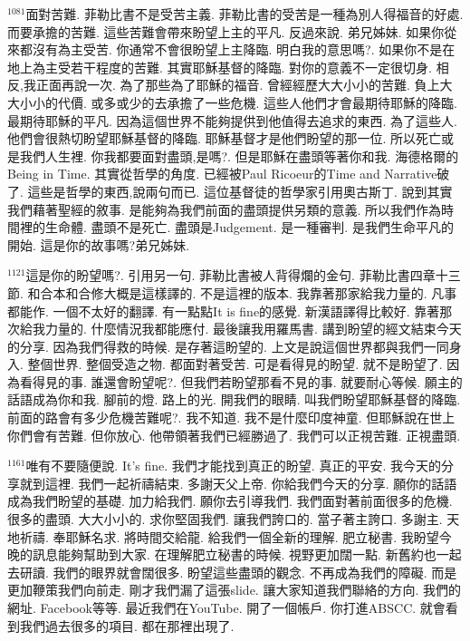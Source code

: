 \documentclass{book}
\begin{document}
$^{1081}$面對苦難.
菲勒比書不是受苦主義.
菲勒比書的受苦是一種為別人得福音的好處.
而要承擔的苦難.
這些苦難會帶來盼望上主的平凡.
反過來說.
弟兄姊妹.
如果你從來都沒有為主受苦.
你通常不會很盼望上主降臨.
明白我的意思嗎?.
如果你不是在地上為主受若干程度的苦難.
其實耶穌基督的降臨.
對你的意義不一定很切身.
相反,我正面再說一次.
為了那些為了耶穌的福音.
曾經經歷大大小小的苦難.
負上大大小小的代價.
或多或少的去承擔了一些危機.
這些人他們才會最期待耶穌的降臨.
最期待耶穌的平凡.
因為這個世界不能夠提供到他值得去追求的東西.
為了這些人.
他們會很熱切盼望耶穌基督的降臨.
耶穌基督才是他們盼望的那一位.
所以死亡或是我們人生裡.
你我都要面對盡頭,是嗎?.
但是耶穌在盡頭等著你和我.
海德格爾的Being in Time.
其實從哲學的角度.
已經被Paul Ricoeur的Time and Narrative破了.
這些是哲學的東西,說兩句而已.
這位基督徒的哲學家引用奧古斯丁.
說到其實我們藉著聖經的敘事.
是能夠為我們前面的盡頭提供另類的意義.
所以我們作為時間裡的生命體.
盡頭不是死亡.
盡頭是Judgement.
是一種審判.
是我們生命平凡的開始.
這是你的故事嗎?弟兄姊妹.

$^{1121}$這是你的盼望嗎?.
引用另一句.
菲勒比書被人背得爛的金句.
菲勒比書四章十三節.
和合本和合修大概是這樣譯的.
不是這裡的版本.
我靠著那家給我力量的.
凡事都能作.
一個不太好的翻譯.
有一點點It is fine的感覺.
新漢語譯得比較好.
靠著那次給我力量的.
什麼情況我都能應付.
最後讓我用羅馬書.
講到盼望的經文結束今天的分享.
因為我們得救的時候.
是存著這盼望的.
上文是說這個世界都與我們一同身入.
整個世界.
整個受造之物.
都面對著受苦.
可是看得見的盼望.
就不是盼望了.
因為看得見的事.
誰還會盼望呢?.
但我們若盼望那看不見的事.
就要耐心等候.
願主的話語成為你和我.
腳前的燈.
路上的光.
開我們的眼睛.
叫我們盼望耶穌基督的降臨.
前面的路會有多少危機苦難呢?.
我不知道.
我不是什麼印度神童.
但耶穌說在世上你們會有苦難.
但你放心.
他帶領著我們已經勝過了.
我們可以正視苦難.
正視盡頭.

$^{1161}$唯有不要隨便說.
It's fine.
我們才能找到真正的盼望.
真正的平安.
我今天的分享就到這裡.
我們一起祈禱結束.
多謝天父上帝.
你給我們今天的分享.
願你的話語成為我們盼望的基礎.
加力給我們.
願你去引導我們.
我們面對著前面很多的危機.
很多的盡頭.
大大小小的.
求你堅固我們.
讓我們誇口的.
當子著主誇口.
多謝主.
天地祈禱.
奉耶穌名求.
將時間交給龍.
給我們一個全新的理解.
肥立秘書.
我盼望今晚的訊息能夠幫助到大家.
在理解肥立秘書的時候.
視野更加闊一點.
新舊約也一起去研讀.
我們的眼界就會闊很多.
盼望這些盡頭的觀念.
不再成為我們的障礙.
而是更加鞭策我們向前走.
剛才我們漏了這張slide.
讓大家知道我們聯絡的方向.
我們的網址.
Facebook等等.
最近我們在YouTube.
開了一個帳戶.
你打進ABSCC.
就會看到我們過去很多的項目.
都在那裡出現了.
\end{document}
